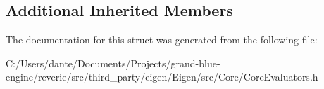 \subsection*{Additional Inherited Members}


The documentation for this struct was generated from the following file\+:\begin{DoxyCompactItemize}
\item 
C\+:/\+Users/dante/\+Documents/\+Projects/grand-\/blue-\/engine/reverie/src/third\+\_\+party/eigen/\+Eigen/src/\+Core/Core\+Evaluators.\+h\end{DoxyCompactItemize}
